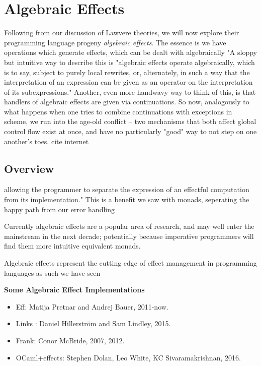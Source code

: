 \section{Algebraic Effects}
Following from our discussion of Lawvere theories,
we will now explore their programming language progeny \textit{algebraic effects}.
The essence is
we have operations which generate effects,
which can be dealt with algebraically
"A sloppy but intuitive way to describe this is "algebraic effects operate algebraically,
which is to say,
subject to purely local rewrites, or, alternately,
in such a way that the interpretation of an expression
can be given as an operator on the interpretation of its subexpressions."
Another, even more handwavy way to think of this,
is that handlers of algebraic effects are given via continuations.
So now, analogously to what happens when one tries to combine continuations
with exceptions in scheme, we run into the age-old conflict --
two mechanisms that both affect global control flow exist at once,
and have no particularly "good" way to not step on one another's toes.
cite internet

\subsection{Overview}


allowing the programmer to separate the expression of an effectful computation from its implementation."
\cite{dolan2015effective}
This is a benefit we saw with monads,
seperating the happy path from our error handling

Currently algebraic effects are a popular area of research,
and may well enter the mainstream in the next decade;
potentially because imperative programmers
will find them more intuitive equivalent monads.

Algebraic effects represent the cutting edge of effect management
in programming languages as such we have seen

\textbf{Some Algebraic Effect Implementations}
\begin{itemize}
    \item Eff: Matija Pretnar and Andrej Bauer, 2011-now.
    \item Links : Daniel Hillerström and Sam Lindley, 2015.
    \item Frank: Conor McBride, 2007, 2012.
    \item OCaml+effects: Stephen Dolan, Leo White, KC Sivaramakrishnan, 2016.
\end{itemize}

